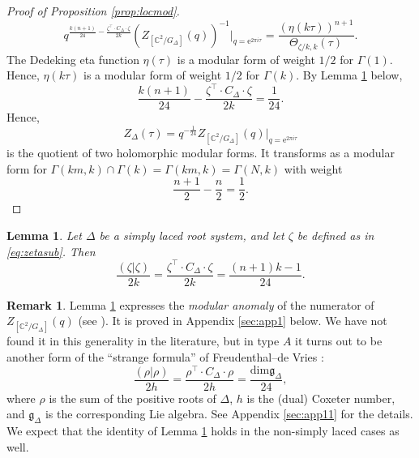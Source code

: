 \documentclass[11pt,a4paper]{amsart}
\newtheorem{lemma}[theorem]{Lemma}
\theoremstyle{definition}
\newtheorem{remark}[theorem]{Remark}
\newcommand{\SC}{\mathbb{C}}                    %
\begin{document}
\begin{proof}[{Proof of Proposition \ref{prop:locmod}}]
\[ q^{\frac{k(n+1)}{24} - \frac{\zeta^\top \cdot C_\Delta \cdot \zeta}{2k}}(Z_{[\SC^2/G_\Delta]}(q))^{-1} \Big|_{q=\mathrm{e}^{2 \pi i \tau}} = \frac{(\eta(k\tau))^{n+1}}{\Theta_{\zeta/k ,k}(\tau )}. \]
The Dedeking eta function $\eta(\tau)$ is a modular form of weight $1/2$ for $\Gamma(1)$. Hence, $\eta(k\tau)$ is a modular form of weight $1/2$ for $\Gamma(k)$.
By Lemma \ref{lem:betalength} below,
\[ \frac{k(n+1)}{24} - \frac{\zeta^\top \cdot C_\Delta \cdot \zeta}{2k}=\frac{1}{24}. \]
Hence,
\[ Z_{\Delta}(\tau)=q^{-\frac{1}{24}}Z_{[\SC^2/G_\Delta]}(q)\Big|_{q=\mathrm{e}^{2 \pi i \tau}} \]
is the quotient of two holomorphic modular forms. It transforms as a modular form for $\Gamma(km,k)\cap \Gamma(k)=\Gamma(km,k)=\Gamma(N,k)$ with weight 
\[ \frac{n+1}{2}-\frac{n}{2}=\frac{1}{2}. \]
\end{proof}
\begin{lemma} Let $\Delta$ be a simply laced root system, and let $\zeta$ be defined as in \eqref{eq:zetasub}. Then
\[ \frac{(\zeta|\zeta)}{2k}=\frac{\zeta^\top \cdot C_\Delta \cdot \zeta}{2k}=\frac{(n+1)k-1}{24}. \]
\label{lem:betalength}
\end{lemma}
\begin{remark}Lemma \ref{lem:betalength} expresses the \emph{modular anomaly} of the numerator of $Z_{[\SC^2/G_\Delta]}(q)$ (see \cite[12.7.5]{kac1994infinite}). It is proved in Appendix \ref{sec:app1} below. We have not found it in this generality in the literature, but in type $A$ it turns out to be another form of the ``strange formula'' of Freudenthal--de Vries \cite{freudenthal1969linear}:
\[ \frac{(\rho|\rho)}{2h}=\frac{\rho^\top \cdot C_\Delta \cdot \rho}{2h}=\frac{\mathrm{dim} \mathfrak{g}_{\Delta}}{24}, \]
where $\rho$ is the sum of the positive roots of $\Delta$, $h$ is the (dual) Coxeter number, and $\mathfrak{g}_{\Delta}$ is the corresponding Lie algebra.
See Appendix \ref{sec:app11} for the details. We expect that the identity of Lemma \ref{lem:betalength} holds in the non-simply laced cases as well.
\end{remark}
\end{document}

